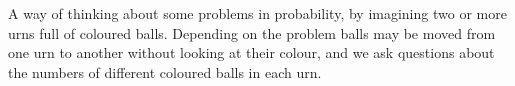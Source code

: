 A way of thinking about some problems in probability, by 
imagining two or more urns full of coloured balls. Depending
on the problem balls may be moved from one urn to another without
looking at their colour, and we ask questions about the numbers
of different coloured balls in each urn.
